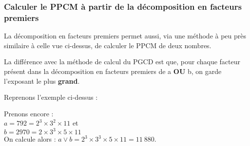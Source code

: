\subsubsection{Calculer le PPCM à partir de la décomposition en facteurs premiers}
\label{part:ppcm_decompo}

La décomposition en facteurs premiers permet aussi, via une méthode à peu près similaire à celle vue ci-dessus, de calculer le PPCM de deux nombres.

La différence avec la méthode de calcul du PGCD est que, pour chaque facteur présent dans la décomposition en facteurs premiers de a \textbf{OU} b, on garde l'exposant le plus \textbf{grand}.

Reprenons l'exemple ci-dessus :

\begin{example}
Prenons encore :\\
$a = 792 = 2^3 \times 3^2 \times 11$ et \\
$b = 2970 = 2 \times 3^3 \times 5 \times 11$\\
On calcule alors :
$a \vee b = 2^3 \times 3^3 \times 5 \times 11 = 11 \ 880$.
\end{example}